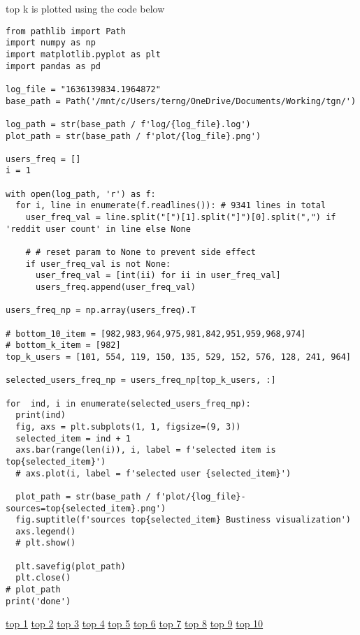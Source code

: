 \documentclass[11pt]{article}
\begin{document}
top k is plotted using the code below
\begin{verbatim}
from pathlib import Path
import numpy as np
import matplotlib.pyplot as plt
import pandas as pd

log_file = "1636139834.1964872"
base_path = Path('/mnt/c/Users/terng/OneDrive/Documents/Working/tgn/')

log_path = str(base_path / f'log/{log_file}.log')
plot_path = str(base_path / f'plot/{log_file}.png')

users_freq = []
i = 1

with open(log_path, 'r') as f:
  for i, line in enumerate(f.readlines()): # 9341 lines in total
    user_freq_val = line.split("[")[1].split("]")[0].split(",") if 'reddit user count' in line else None

    # # reset param to None to prevent side effect
    if user_freq_val is not None:
      user_freq_val = [int(ii) for ii in user_freq_val]
      users_freq.append(user_freq_val)

users_freq_np = np.array(users_freq).T

# bottom_10_item = [982,983,964,975,981,842,951,959,968,974]
# bottom_k_item = [982]
top_k_users = [101, 554, 119, 150, 135, 529, 152, 576, 128, 241, 964]

selected_users_freq_np = users_freq_np[top_k_users, :]

for  ind, i in enumerate(selected_users_freq_np):
  print(ind)
  fig, axs = plt.subplots(1, 1, figsize=(9, 3))
  selected_item = ind + 1
  axs.bar(range(len(i)), i, label = f'selected item is top{selected_item}')
  # axs.plot(i, label = f'selected user {selected_item}')

  plot_path = str(base_path / f'plot/{log_file}-sources=top{selected_item}.png')
  fig.suptitle(f'sources top{selected_item} Bustiness visualization')
  axs.legend()
  # plt.show()

  plt.savefig(plot_path)
  plt.close()
# plot_path
print('done')

\end{verbatim}

\href{file:///mnt/c/Users/terng/OneDrive/Documents/Working/tgn/plot/1636139834.1964872-sources=top1.png}{top 1}
\href{file:///mnt/c/Users/terng/OneDrive/Documents/Working/tgn/plot/1636139834.1964872-sources=top2.png}{top 2}
\href{file:///mnt/c/Users/terng/OneDrive/Documents/Working/tgn/plot/1636139834.1964872-sources=top3.png}{top 3}
\href{file:///mnt/c/Users/terng/OneDrive/Documents/Working/tgn/plot/1636139834.1964872-sources=top4.png}{top 4}
\href{file:///mnt/c/Users/terng/OneDrive/Documents/Working/tgn/plot/1636139834.1964872-sources=top5.png}{top 5}
\href{file:///mnt/c/Users/terng/OneDrive/Documents/Working/tgn/plot/1636139834.1964872-sources=top6.png}{top 6}
\href{file:///mnt/c/Users/terng/OneDrive/Documents/Working/tgn/plot/1636139834.1964872-sources=top7.png}{top 7}
\href{file:///mnt/c/Users/terng/OneDrive/Documents/Working/tgn/plot/1636139834.1964872-sources=top8.png}{top 8}
\href{file:///mnt/c/Users/terng/OneDrive/Documents/Working/tgn/plot/1636139834.1964872-sources=top9.png}{top 9}
\href{file:///mnt/c/Users/terng/OneDrive/Documents/Working/tgn/plot/1636139834.1964872-sources=top10.png}{top 10}
\end{document}
